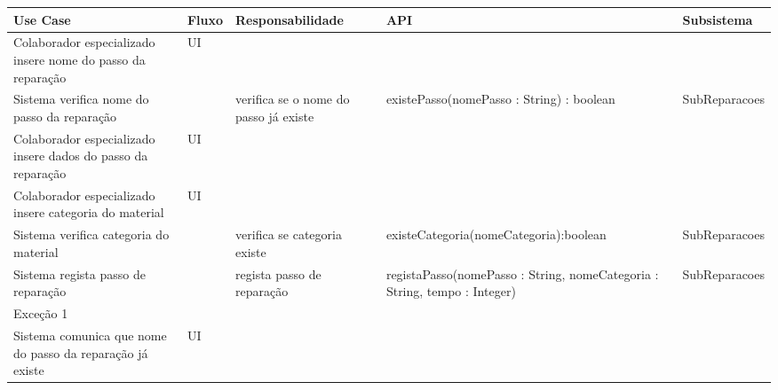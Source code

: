 \documentclass[../relatorio.tex]{subfiles}
\begin{document}
\begin{landscape}
    \begin{table}[!h]
        \centering
        \begin{tabular}{|p{5cm}|p{1cm}|p{4cm}|p{6cm}|p{3cm}|}
            \hline
            \rowcolor{gray!20!white}
            Use Case & Fluxo                                            & Responsabilidade & API & Subsistema \\
            \hline
            \rowcolor{yellow}
            Colaborador especializado insere nome do passo da reparação
                     & UI
                     & 
                     & 
                     & 
            \\
            \hline
            Sistema verifica nome do passo da reparação
                     & 
                     & verifica se o nome do passo já existe
                     & existePasso(nomePasso : String) : boolean
                     & SubReparacoes
            \\
            \hline
            \rowcolor{yellow}
            Colaborador especializado insere dados do passo da reparação
                     & UI
                     & 
                     & 
                     & 
            \\
            \hline
            \rowcolor{yellow}
            Colaborador especializado insere categoria do material
                     & UI
                     & 
                     & 
                     & 
            \\
            \hline
            Sistema verifica categoria do material
                     & 
                     & verifica se categoria existe
                     & existeCategoria(nomeCategoria):boolean
                     & SubReparacoes
            \\
            \hline
            Sistema regista passo de reparação
                     & 
                     & regista passo de reparação
                     & registaPasso(nomePasso : String, nomeCategoria : String, tempo : Integer)
                     & SubReparacoes
            \\
            \hline
            \rowcolor{red!30}
            Exceção 1 &                                                  &                  &     &            \\
            \hline
            \rowcolor{yellow}
            Sistema comunica que nome do passo da reparação já existe
                     & UI
                     & 
                     & 

\end{tabular}
\end{table}
\end{landscape}
\end{document}
